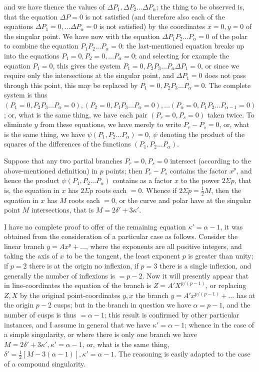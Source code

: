 \documentclass[11pt]{article}
\begin{document}
and we have thence the values of $\Delta P_1, \Delta P_2 \ldots \Delta P_\alpha$; the thing to be observed is, that the equation $\Delta P = 0$ is not satisfied (and therefore also each of the equations $\Delta P_1 = 0, \ldots \Delta P_\alpha = 0$ is not satisfied) by the coordinates $x = 0, y = 0$ of the singular point. We have now with the equation $\Delta P_1 P_2 \ldots P_\alpha = 0$ of the polar to combine the equation $P_1 P_2 \ldots P_\alpha = 0$: the last-mentioned equation breaks up into the equations $P_1 = 0, P_2 = 0, \ldots P_\alpha = 0$; and selecting for example the equation $P_1 = 0$, this gives the system $P_1 = 0, P_2 P_3 \ldots P_\alpha \Delta P_1 = 0$, or since we require only the intersections at the singular point, and $\Delta P_1 = 0$ does not pass through this point, this may be replaced by $P_1 = 0, P_2 P_3 \ldots P_\alpha = 0$. The complete system is thus $(P_1 = 0, P_2 P_3 \ldots P_\alpha = 0), (P_2 = 0, P_1 P_3 \ldots P_\alpha = 0), \ldots (P_\alpha = 0, P_1 P_2 \ldots P_{\alpha - 1} = 0)$; or, what is the same thing, we have each pair $(P_r = 0, P_s = 0)$ taken twice. To eliminate $y$ from these equations, we have merely to write $P_r - P_s = 0$, or, what is the same thing, we have $\psi(P_1, P_2 \ldots P_\alpha) = 0$, $\psi$ denoting the product of the squares of the differences of the functions $(P_1, P_2 \ldots P_\alpha)$.

Suppose that any two partial branches $P_r = 0, P_s = 0$ intersect (according to the above-mentioned definition) in $p$ points; then $P_r - P_s$ contains the factor $x^p$, and hence the product $\psi(P_1, P_2 \ldots P_\alpha)$ contains as a factor $x$ to the power $2\Sigma p$, that is, the equation in $x$ has $2\Sigma p$ roots each $= 0$. Whence if $2\Sigma p = \tfrac{1}{2}M$, then the equation in $x$ has $M$ roots each $= 0$, or the curve and polar have at the singular point $M$ intersections, that is $M = 2\delta' + 3\kappa'$.

I have no complete proof to offer of the remaining equation $\kappa' = \alpha - 1$, it was obtained from the consideration of a particular case as follows. Consider the linear branch $y = A x^p + \ldots$, where the exponents are all positive integers, and taking the axis of $x$ to be the tangent, the least exponent $p$ is greater than unity; if $p = 2$ there is at the origin no inflexion, if $p = 3$ there is a single inflexion, and generally the number of inflexions is $= p - 2$. Now it will presently appear that in line-coordinates the equation of the branch is $Z = A' X^{p/(p-1)}$, or replacing $Z, X$ by the original point-coordinates $y, x$ the branch $y = A' x^{p/(p-1)} + \ldots$ has at the origin $p - 2$ cusps; but in the branch in question we have $\alpha = p - 1$, and the number of cusps is thus $= \alpha - 1$; this result is confirmed by other particular instances, and I assume in general that we have $\kappa' = \alpha - 1$; whence in the case of a simple singularity, or where there is only one branch we have $M = 2\delta' + 3\kappa', \kappa' = \alpha - 1$, or, what is the same thing, $\delta' = \tfrac{1}{2}[M - 3(\alpha - 1)], \kappa' = \alpha - 1$. The reasoning is easily adapted to the case of a compound singularity.
\end{document}
